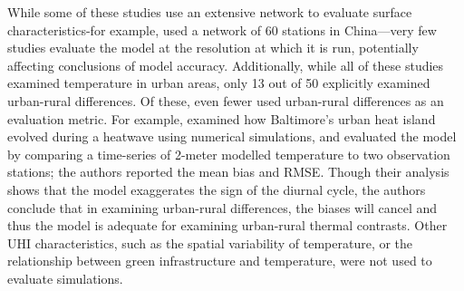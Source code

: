 \documentclass[draft,linenumbers]{agujournal}
\begin{document}

While some of these studies use an extensive network to evaluate surface characteristics-for example, \cite{miao2011impacts} used a network of 60 stations in China---very few studies evaluate the model at the resolution at which it is run, potentially affecting conclusions of model accuracy. Additionally, while all of these studies examined temperature in urban areas, only 13 out of 50 explicitly examined urban-rural differences. Of these, even fewer used urban-rural differences as an evaluation metric. For example, \citet{li2013synergistic} examined how Baltimore's urban heat island evolved during a heatwave using numerical simulations, and evaluated the model by comparing a time-series of 2-meter modelled temperature to two observation stations; the authors reported the mean bias and RMSE. Though their analysis shows that the model exaggerates the sign of the diurnal cycle, the authors conclude that in examining urban-rural differences, the biases will cancel and thus the model is adequate for examining urban-rural thermal contrasts.  Other UHI characteristics, such as the spatial variability of temperature, or the relationship between green infrastructure and temperature, were not used to evaluate simulations. 

\end{document}
